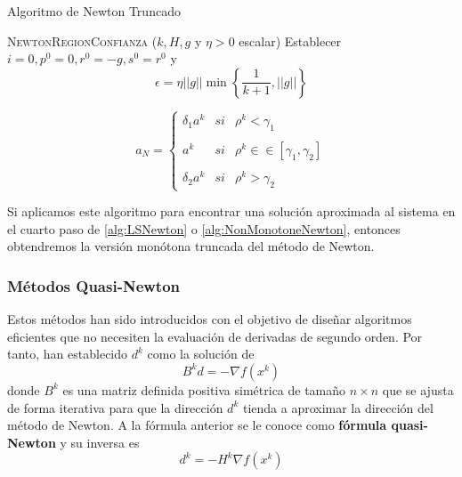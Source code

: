 \begin{algorithm}[H]
\caption{Algoritmo de Newton Truncado}\label{alg:NewtonTruncado}
\begin{algorithmic}[1]
\Procedure \textsc{NewtonRegionConfianza} ($k,H,g$ y $\eta>0$ escalar)
\State Establecer $i=0, p^0=0,r^0=-g,s^0=r^0$ y \begin{equation*}
	\epsilon = \eta ||g||\min\left\lbrace \dfrac{1}{k+1}, ||g|| \right\rbrace
\end{equation*}
\While{}

\EndWhile
\State \begin{equation*}
	a_N = \left\{ \begin{array}{lcc}
             \delta_1a^k &   si  & \rho^k < \gamma_1 \\
             \\ a^k &  si & \rho^k\in\in [\gamma_1,\gamma_2] \\
             \\ \delta_2a^k & si & \rho^k > \gamma_2
             \end{array}
   \right.
	\end{equation*}
\EndProcedure
\end{algorithmic}
\end{algorithm}

Si aplicamos este algoritmo para encontrar una solución aproximada al sistema en el cuarto paso de \ref{alg:LSNewton} o \ref{alg:NonMonotoneNewton}, entonces obtendremos la versión monótona truncada del método de Newton.

\subsubsection{Métodos Quasi-Newton}

Estos métodos han sido introducidos con el objetivo de diseñar algoritmos eficientes que no necesiten la evaluación de derivadas de segundo orden. 
Por tanto, han establecido $d^k$ como la solución de 
\begin{equation}
B^kd = -\nabla f(x^k)
\label{eq:4.27}
\end{equation}
donde $B^k$ es una matriz definida positiva simétrica de tamaño $n\times n$ que se ajusta de forma iterativa para que la dirección $d^k$ tienda a aproximar la dirección del método de Newton. 
A la fórmula anterior se le conoce como \textbf{fórmula quasi-Newton} y su inversa es
\begin{equation}
d^k = - H^k\nabla f(x^k)
\label{eq:4.28}
\end{equation}

